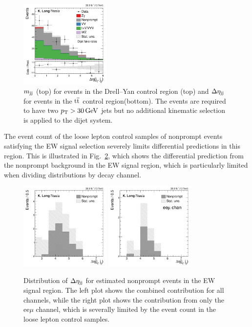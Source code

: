 \begin{figure}[htbp]
   \includegraphics[width=0.4\textwidth]{figures/AnalysisProcedure/dEtajj_3lTTbarControl_dijetFRs.pdf}
  \caption{
    $m_{\mathrm{jj}}$ (top) for events in the Drell--Yan control region (top)
    and $\Delta\eta_{\mathrm{jj}}$ for events in the ${\mathrm{t}\overline{\mathrm{t}}}$ control region(bottom).
    The events are required to have two $p_{\mathrm{T}} > 30\,\text{Ge\hspace{-.08em}V}$
    jets but no additional kinematic selection is applied to the dijet system.
        }
 \label{fig:nonpromptValidationRegions}
\end{figure}

The event count of the loose lepton control samples of nonprompt events
satisfying the EW signal selection severely limits
differential predictions in this region. This is illustrated in 
Fig.~\ref{fig:nonpromptdEtajjByChan}, which shows the differential
prediction from the nonprompt background in the EW signal region,
which is particularly limited when dividing distributions by decay channel.

\begin{figure}[htbp]
  \centering
   \includegraphics[width=0.4\textwidth]{figures/AnalysisProcedure/dEtajj_nonprompt.pdf}
   \includegraphics[width=0.4\textwidth]{figures/AnalysisProcedure/dEtajj_nonprompt_eem.pdf}
  \caption{
    Distribution of $\Delta\eta_{\mathrm{jj}}$ for estimated nonprompt events in the EW signal region. The
    left plot shows the combined contribution for all channels, while the right plot shows
    the contribution from only the ee$\mu$ channel, which is severally limited by the 
    event count in the loose lepton control samples. 
        }
 \label{fig:nonpromptdEtajjByChan}
\end{figure}


